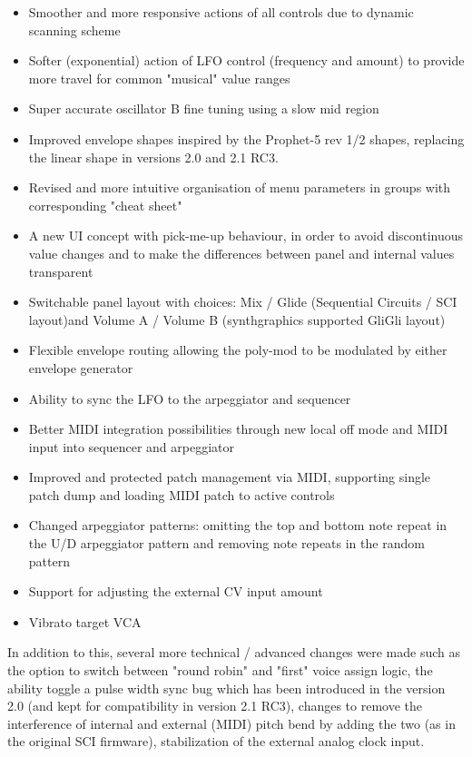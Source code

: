 \documentclass[landscape, 11pt, oneside, twoside]{report}
\newenvironment{flowtext}{\addmargin[0cm]{0cm}}{\endaddmargin} %
\begin{document}
\begin{flowtext}
\begin{itemize}
  \setlength\itemsep{0cm}
  \item Smoother and more responsive actions of all controls due to dynamic scanning scheme 
  \item Softer (exponential) action of LFO control (frequency and amount) to provide more travel for common "musical" value ranges
  \item Super accurate oscillator B fine tuning using a slow mid region
  \item Improved envelope shapes inspired by the Prophet-5 rev 1/2 shapes, replacing the linear shape in versions 2.0 and 2.1 RC3.  
  \item Revised and more intuitive organisation of menu parameters in groups with corresponding "cheat sheet"
  \item A new UI concept with pick-me-up behaviour, in order to avoid discontinuous value changes and to make the differences between panel and internal values transparent 
  \item Switchable panel layout with choices: Mix / Glide (Sequential Circuits / SCI layout)and Volume A / Volume B (synthgraphics supported GliGli layout) 
  \item Flexible envelope routing allowing the poly-mod to be modulated by either envelope generator
  \item Ability to sync the LFO to the arpeggiator and sequencer
  \item Better MIDI integration possibilities through new local off mode and MIDI input into sequencer and arpeggiator
  \item Improved and protected patch management via MIDI, supporting single patch dump and loading MIDI patch to active controls 
  \item Changed arpeggiator patterns: omitting the top and bottom note repeat in the U/D arpeggiator pattern and removing note repeats in the random pattern
  \item Support for adjusting the external CV input amount
  \item Vibrato target VCA
\end{itemize}

In addition to this, several more technical / advanced changes were made such as the option to switch between "round robin" and "first" voice assign logic, the ability toggle a pulse width sync bug which has been introduced in the version 2.0 (and kept for compatibility in version 2.1 RC3), changes to remove the interference  of internal and external (MIDI) pitch bend by adding the two (as in the original SCI firmware), stabilization of the external analog clock input.


\end{flowtext}
\end{document}
